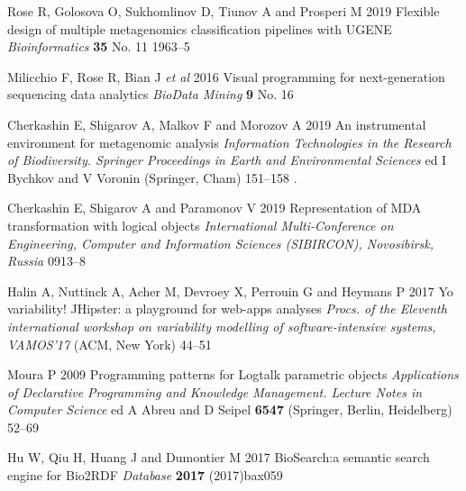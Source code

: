 \documentclass[a4paper]{jpconf}
\begin{document}
\begin{thebibliography}{0}
  Rose R, Golosova O, Sukhomlinov D, Tiunov A and Prosperi M 2019 Flexible design of multiple metagenomics classification pipelines with UGENE \emph{Bioinformatics} \textbf{35} No. 11 1963--5 

 Milicchio F, Rose R, Bian J \emph{et al} 2016 Visual programming for next-generation sequencing data analytics \emph{BioData Mining} \textbf{9} No. 16 

 Cherkashin E, Shigarov A, Malkov F and Morozov A 2019 An instrumental environment for metagenomic analysis \emph{Information Technologies in the Research of Biodiversity. Springer Proceedings in Earth and Environmental Sciences} ed I Bychkov and V Voronin (Springer, Cham) 151--158 .

  Cherkashin E, Shigarov A and Paramonov V 2019 Representation of MDA transformation with logical objects \emph{International Multi-Conference on Engineering, Computer and Information Sciences (SIBIRCON), Novosibirsk, Russia} 0913--8 

 Halin A, Nuttinck A, Acher M, Devroey X, Perrouin G and Heymans P 2017 Yo variability! JHipster: a playground for web-apps analyses \emph{Procs. of the Eleventh international workshop on variability modelling of software-intensive systems, VAMOS’17} (ACM, New York) 44–51 

 Moura P 2009 Programming patterns for Logtalk parametric objects \emph{Applications of Declarative Programming and Knowledge Management. Lecture Notes in Computer Science} ed A Abreu and D Seipel \textbf{6547} (Springer, Berlin, Heidelberg) 52--69 

 Hu W, Qiu H, Huang J and Dumontier M 2017 BioSearch:\@ a semantic search engine for Bio2RDF \emph{Database} \textbf{2017} (2017)bax059 














\end{thebibliography}
\end{document}
